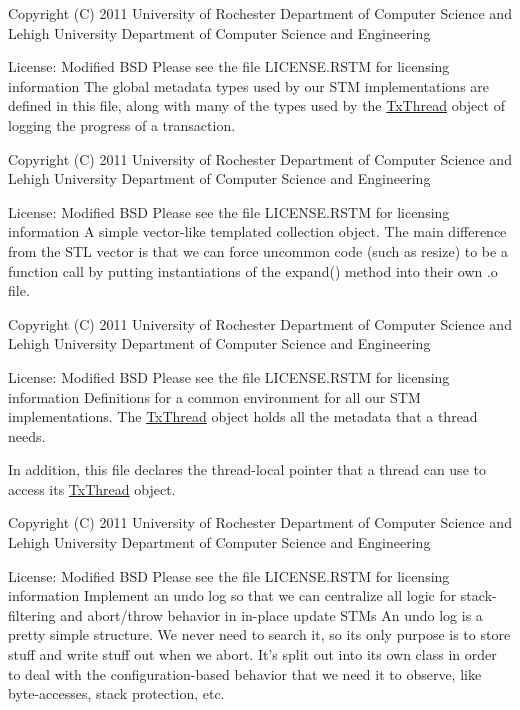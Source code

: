 Copyright (C) 2011 University of Rochester Department of Computer Science and Lehigh University Department of Computer Science and Engineering

License\-: Modified B\-S\-D Please see the file L\-I\-C\-E\-N\-S\-E.\-R\-S\-T\-M for licensing information The global metadata types used by our S\-T\-M implementations are defined in this file, along with many of the types used by the \hyperlink{structstm_1_1TxThread}{Tx\-Thread} object of logging the progress of a transaction.

Copyright (C) 2011 University of Rochester Department of Computer Science and Lehigh University Department of Computer Science and Engineering

License\-: Modified B\-S\-D Please see the file L\-I\-C\-E\-N\-S\-E.\-R\-S\-T\-M for licensing information A simple vector-\/like templated collection object. The main difference from the S\-T\-L vector is that we can force uncommon code (such as resize) to be a function call by putting instantiations of the expand() method into their own .o file.

Copyright (C) 2011 University of Rochester Department of Computer Science and Lehigh University Department of Computer Science and Engineering

License\-: Modified B\-S\-D Please see the file L\-I\-C\-E\-N\-S\-E.\-R\-S\-T\-M for licensing information Definitions for a common environment for all our S\-T\-M implementations. The \hyperlink{structstm_1_1TxThread}{Tx\-Thread} object holds all the metadata that a thread needs.

In addition, this file declares the thread-\/local pointer that a thread can use to access its \hyperlink{structstm_1_1TxThread}{Tx\-Thread} object.

Copyright (C) 2011 University of Rochester Department of Computer Science and Lehigh University Department of Computer Science and Engineering

License\-: Modified B\-S\-D Please see the file L\-I\-C\-E\-N\-S\-E.\-R\-S\-T\-M for licensing information Implement an undo log so that we can centralize all logic for stack-\/filtering and abort/throw behavior in in-\/place update S\-T\-Ms An undo log is a pretty simple structure. We never need to search it, so its only purpose is to store stuff and write stuff out when we abort. It's split out into its own class in order to deal with the configuration-\/based behavior that we need it to observe, like byte-\/accesses, stack protection, etc.

